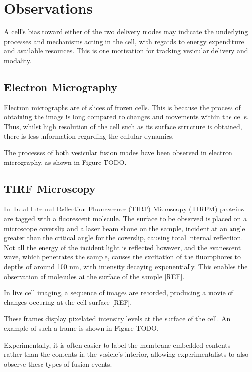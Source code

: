 \documentclass{report}
\begin{document}
\chapter{Observations}
A cell's bias toward either of the two delivery modes may indicate the underlying processes and mechanisms acting in the cell, with regards to energy expenditure and available resources. This is one motivation for tracking vesicular delivery and modality.

\section{Electron Micrography}
Electron micrographs are of slices of frozen cells. This is because the process of obtaining the image is long compared to changes and movements within the cells. Thus, whilst high resolution of the cell such as its surface structure is obtained, there is less information regarding the cellular dynamics.

The processes of both vesicular fusion modes have been observed in electron micrography, as shown in Figure TODO.

\section{TIRF Microscopy}
In Total Internal Reflection Fluorescence (TIRF) Microscopy (TIRFM) proteins are tagged with a fluorescent molecule. The surface to be observed is placed on a microscope coverslip and a laser beam shone on the sample, incident at an angle greater than the critical angle for the coverslip, causing total internal reflection. Not all the energy of the incident light is reflected however, and the evanescent wave, which penetrates the sample, causes the excitation of the fluorophores to depths of around 100 nm, with intensity decaying exponentially. This enables the observation of molecules at the surface of the sample [REF].

In live cell imaging, a sequence of images are recorded, producing a movie of changes occuring at the cell surface [REF].

These frames display pixelated intensity levels at the surface of the cell. An example of such a frame is shown in Figure TODO.

Experimentally, it is often easier to label the membrane embedded contents rather than the contents in the vesicle's interior, allowing experimentalists to also observe these types of fusion events.
\end{document}
